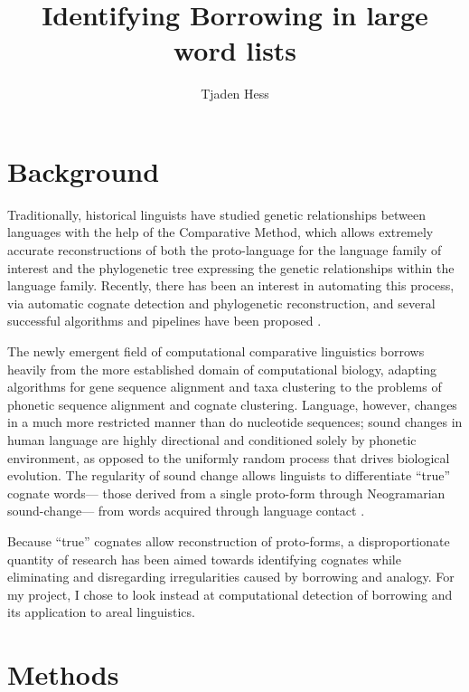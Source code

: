 \documentclass[doc,natbib]{apa6}
\title{Identifying Borrowing in large word lists}
\author{Tjaden Hess}
\affiliation{Cornell University}
\begin{document}
\maketitle

\begin{abstract}
	
\end{abstract}

\section{ Background }

Traditionally, historical linguists have studied genetic relationships between languages with the help of the Comparative Method, which allows extremely accurate reconstructions of both the proto-language for the language family of interest and the phylogenetic tree expressing the genetic relationships within the language family. Recently, there has been an interest in automating this process, via automatic cognate detection and phylogenetic reconstruction, and several successful algorithms and pipelines have been proposed \citep{List2017a}.

The newly emergent field of computational comparative linguistics borrows heavily from the more established domain of computational biology, adapting algorithms for gene sequence alignment and taxa clustering to the problems of phonetic sequence alignment and cognate clustering. Language, however, changes in a much more restricted manner than do nucleotide sequences; sound changes in human language are highly directional and conditioned solely by phonetic environment, as opposed to the uniformly random process that drives biological evolution. The regularity of sound change allows linguists to differentiate ``true'' cognate words--- those derived from a single proto-form through Neogramarian sound-change--- from words acquired through language contact \citep[p. 108]{Campbell1999}.

Because ``true'' cognates allow reconstruction of proto-forms, a disproportionate quantity of research has been aimed towards identifying cognates while eliminating and disregarding irregularities caused by borrowing and analogy. For my project, I chose to look instead at computational detection of borrowing and its application to areal linguistics.

\section{Methods}
\end{document}
